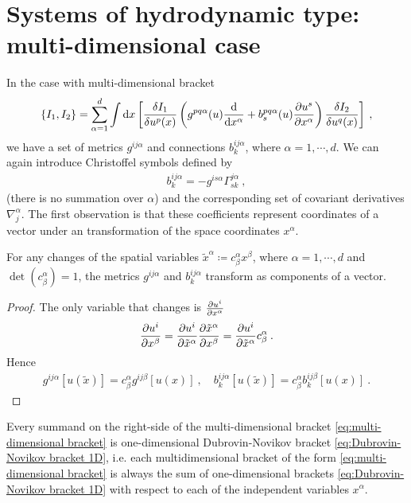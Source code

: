 \chapter{Systems of hydrodynamic type:  multi-dimensional case}

In the case with multi-dimensional bracket
\begin{align}
    \left \lbrace I_1,I_2 \right \rbrace = \sum_{\alpha = 1}^ d \int \mathrm{d} x 
    \left[ \frac{\delta I_1}{\delta u^p(x)} \left( g^{pq \alpha}(u) \frac{\mathrm{d}}{\mathrm{d}x^\alpha} + b^{pq\alpha}_s(u) \frac{\partial u^s}{\partial x^\alpha} \right) \frac{\delta I_2}{\delta u^q(x)} \right] \:, \label{eq:multi-dimensional bracket}
\end{align}
we have a set of metrics $g^{ij \alpha}$ and connections $b^{ij \alpha}_k$, where $\alpha = 1 , \cdots, d$. We can again introduce Christoffel symbols defined by
\begin{align}
    b^{i j \alpha}_k = - g^{is \alpha} \Gamma^{j \alpha}_{sk}\:,
\end{align}
(there is no summation over $\alpha$) and the corresponding set of covariant derivatives $\nabla^{\alpha}_j$. The first observation is that these coefficients represent coordinates of a vector under an transformation of the space coordinates $x^\alpha$.
\begin{proposition}
    For any changes of the spatial variables $\tilde x^\alpha \coloneqq c^\alpha_\beta x^\beta$, where $\alpha = 1, \cdots, d$ and $\det (c^\alpha_\beta) = 1$, the metrics $g^{ij \alpha}$ and $b^{ij \alpha}_k$ transform as components of a vector.
\end{proposition}

\begin{proof}
    The only variable that changes is $\frac{\partial u^i}{\partial x^\alpha}$
    \begin{align}
        \frac{\partial u^i}{\partial x^\beta} = \frac{\partial u^i}{\partial \tilde x^\alpha} \frac{\partial \tilde x^\alpha}{\partial x^\beta} = \frac{\partial u^i}{\partial \tilde x^\alpha} c^\alpha_\beta \:.
    \end{align}
    Hence
    \begin{align}
        g^{ij \alpha}[u(\tilde x)] = c^\alpha_\beta g^{ij \beta}[u(x)] \:, \quad b^{ij \alpha}_k [u(\tilde x)] = c^\alpha_\beta b^{ij \beta}_k [u(x)] \:.
    \end{align}
\end{proof}

Every summand on the right-side of the multi-dimensional bracket \eqref{eq:multi-dimensional bracket} is one-dimensional Dubrovin-Novikov bracket \eqref{eq:Dubrovin-Novikov bracket 1D}, i.e. each multidimensional bracket of the form \eqref{eq:multi-dimensional bracket} is always the sum of one-dimensional brackets \eqref{eq:Dubrovin-Novikov bracket 1D} with respect to each of the independent variables $x^\alpha$.

